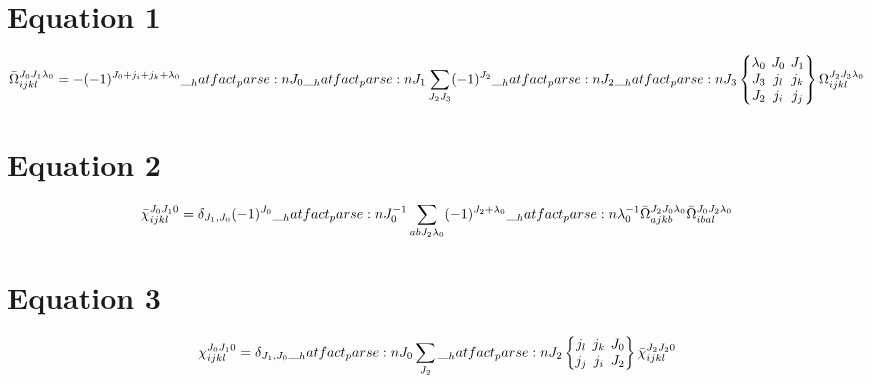 \documentclass{scrartcl}
\newcommand{\sixj}[6]{\begingroup\setlength{\arraycolsep}{0.2em}\begin{Bmatrix} #1 & #2 & #3 \\ #4 & #5 & #6 \end{Bmatrix}\endgroup}
\newcommand{\ninej}[9]{\begingroup\setlength{\arraycolsep}{0.2em}\begin{Bmatrix} #1 & #2 & #3 \\ #4 & #5 & #6 \\ #7 & #8 & #9 \end{Bmatrix}\endgroup}
\begin{document}
\section{Equation 1}
\begin{dmath*}
\bar{\Omega}_{i j k l}^{{J}_{0} {J}_{1} {{\lambda}}_{0}} = -(-1)^{{J}_{0}+{j}_{i}+{j}_{k}+{{\lambda}}_{0}} \* \hatfact{{J}_{0}} \* \hatfact{{J}_{1}} \* \sum_{{J}_{2} {J}_{3}} \* (-1)^{{J}_{2}} \* \hatfact{{J}_{2}} \* \hatfact{{J}_{3}} \* \ninej{{{\lambda}}_{0}}{{J}_{0}}{{J}_{1}}{{J}_{3}}{{j}_{l}}{{j}_{k}}{{J}_{2}}{{j}_{i}}{{j}_{j}} \* \Omega_{i j k l}^{{J}_{2} {J}_{3} {{\lambda}}_{0}}
\end{dmath*}

\section{Equation 2}
\begin{dmath*}
\bar{\chi}_{i j k l}^{{J}_{0} {J}_{1} 0} = \delta_{{J}_{1},{J}_{0}} \* (-1)^{{J}_{0}} \* \hatfact{{J}_{0}^{-1}} \* \sum_{a b {J}_{2} {{\lambda}}_{0}} \* (-1)^{{J}_{2}+{{\lambda}}_{0}} \* \hatfact{{{\lambda}}_{0}^{-1}} \* \bar{\Omega}_{a j k b}^{{J}_{2} {J}_{0} {{\lambda}}_{0}} \* \bar{\Omega}_{i b a l}^{{J}_{0} {J}_{2} {{\lambda}}_{0}}
\end{dmath*}

\section{Equation 3}
\begin{dmath*}
\chi_{i j k l}^{{J}_{0} {J}_{1} 0} = \delta_{{J}_{1},{J}_{0}} \* \hatfact{{J}_{0}} \* \sum_{{J}_{2}} \* \hatfact{{J}_{2}} \* \sixj{{j}_{l}}{{j}_{k}}{{J}_{0}}{{j}_{j}}{{j}_{i}}{{J}_{2}} \* \bar{\chi}_{i j k l}^{{J}_{2} {J}_{2} 0}
\end{dmath*}
\end{document}
